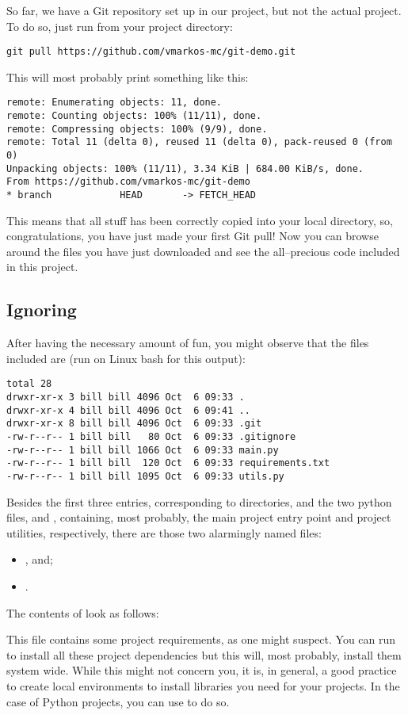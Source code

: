 \documentclass[a4paper, 11pt]{article}
\numberwithin{equation}{section}
\theoremstyle{definition}
\begin{document}
	So far, we have a Git repository set up in our project, but not the actual project. To do so, just run from your project directory:
	\begin{lstlisting}
git pull https://github.com/vmarkos-mc/git-demo.git\end{lstlisting}
	This will most probably print something like this:
	\begin{lstlisting}
remote: Enumerating objects: 11, done.
remote: Counting objects: 100% (11/11), done.
remote: Compressing objects: 100% (9/9), done.
remote: Total 11 (delta 0), reused 11 (delta 0), pack-reused 0 (from 0)
Unpacking objects: 100% (11/11), 3.34 KiB | 684.00 KiB/s, done.
From https://github.com/vmarkos-mc/git-demo
* branch            HEAD       -> FETCH_HEAD\end{lstlisting}
	This means that all stuff has been correctly copied into your local directory, so, congratulations, you have just made your first Git pull! Now you can browse around the files you have just downloaded and see the all--precious code included in this project.
	\subsection{Ignoring}\label{subsec:git ignore}
	After having the necessary amount of fun, you might observe that the files included are (run  on Linux bash for this output):
	\begin{lstlisting}
total 28
drwxr-xr-x 3 bill bill 4096 Oct  6 09:33 .
drwxr-xr-x 4 bill bill 4096 Oct  6 09:41 ..
drwxr-xr-x 8 bill bill 4096 Oct  6 09:33 .git
-rw-r--r-- 1 bill bill   80 Oct  6 09:33 .gitignore
-rw-r--r-- 1 bill bill 1066 Oct  6 09:33 main.py
-rw-r--r-- 1 bill bill  120 Oct  6 09:33 requirements.txt
-rw-r--r-- 1 bill bill 1095 Oct  6 09:33 utils.py\end{lstlisting}
	Besides the first three entries, corresponding to directories, and the two python files,  and , containing, most probably, the main project entry point and project utilities, respectively, there are those two alarmingly named files:
	\begin{itemize}
		\item {}, and;
		\item {}.
	\end{itemize}
	The contents of  look as follows:
	
	This file contains some project requirements, as one might suspect. You can run  to install all these project dependencies but this will, most probably, install them system wide. While this might not concern you, it is, in general, a good practice to create local environments to install libraries you need for your projects. In the case of Python projects, you can use  to do so.
	
\end{document}
